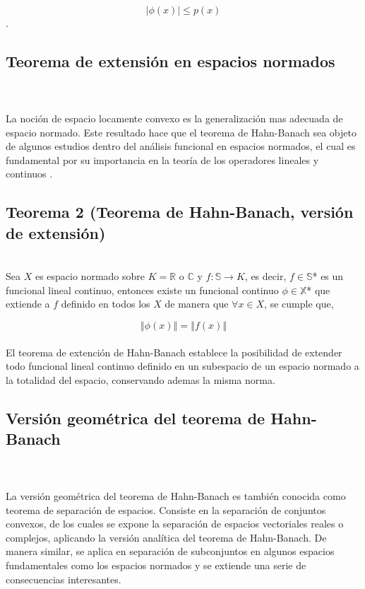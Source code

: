 \documentclass[10pt]{amsart}
\theoremstyle{remark}
\numberwithin{equation}{section}
\begin{document}
\[ \left \vert \phi(x) \right \vert \leq p(x) \].\\ \subsection{Teorema de extensión en espacios normados}\label{v2} \cite{libro10}\\ \\
La noción de espacio locamente convexo es la generalización mas adecuada de espacio normado. Este resultado hace que el teorema de Hahn-Banach sea objeto de algunos estudios dentro del análisis funcional en espacios normados, el cual es fundamental por su importancia en la teoría de los operadores lineales y continuos \cite{ArtAca03}.\\ \subsection*{Teorema 2 (Teorema de Hahn-Banach, versión de extensión)} \ \\ 
Sea $ X $ es espacio normado sobre $ K = \mathbb{R} $ o $ \mathbb{C}$ y $ f \colon \mathbb{S} \to K $, es decir, $f \in \mathbb{S}$* es un funcional lineal continuo, entonces existe un funcional continuo $ \phi \in \mathbb{X}$* que extiende a $ f $ definido en todos los $ X $ de manera que $\forall x \in X$, se cumple que,

\[ \left \Vert \phi(x) \right \Vert = \left \Vert f(x) \right \Vert \]\\

El teorema de extención de Hahn-Banach establece la posibilidad de extender todo funcional lineal continuo definido en un subespacio de un espacio normado a la totalidad del espacio, conservando ademas la misma norma.\\

\subsection{Versión geométrica del teorema de Hahn-Banach}\label{v3}
\cite{libro10}\\ \\ La versión geométrica del teorema de Hahn-Banach es también conocida como teorema de separación de espacios. Consiste en la separación de conjuntos convexos, de los cuales se expone la separación de espacios vectoriales reales o complejos, aplicando la versión analítica del teorema de Hahn-Banach. De manera similar, se aplica en separación de subconjuntos en algunos espacios fundamentales como los espacios normados y se extiende una serie de consecuencias interesantes.\\ 
\end{document}
